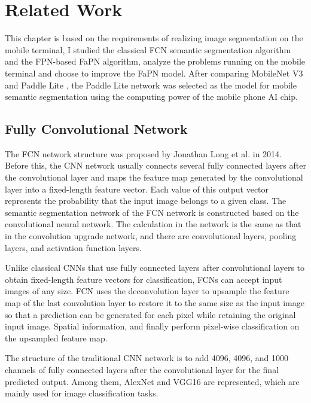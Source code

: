 \section{Related Work}
This chapter is based on the requirements of realizing image segmentation on the mobile terminal, I studied the classical FCN \cite{long2015fully} semantic segmentation algorithm and the FPN-based FaPN \cite{huang2021fapn} algorithm, analyze the problems running on the mobile terminal and choose to improve the FaPN model. After comparing MobileNet V3 and Paddle Lite \cite{paddlelite}, the Paddle Lite network was selected as the model for mobile semantic segmentation using the computing power of the mobile phone AI chip. 

\subsection{Fully Convolutional Network}
The FCN network structure \cite{long2015fully} was proposed by Jonathan Long et al. in 2014. Before this, the CNN network usually connects several fully connected layers after the convolutional layer and maps the feature map generated by the convolutional layer into a fixed-length feature vector. Each value of this output vector represents the probability that the input image belongs to a given class. The semantic segmentation network of the FCN network is constructed based on the convolutional neural network. The calculation in the network is the same as that in the convolution upgrade network, and there are convolutional layers, pooling layers, and activation function layers.

Unlike classical CNNs that use fully connected layers after convolutional layers to obtain fixed-length feature vectors for classification, FCNs can accept input images of any size. FCN uses the deconvolution layer to upsample the feature map of the last convolution layer to restore it to the same size as the input image so that a prediction can be generated for each pixel while retaining the original input image. Spatial information, and finally perform pixel-wise classification on the upsampled feature map.

The structure of the traditional CNN network is to add 4096, 4096, and 1000 channels of fully connected layers after the convolutional layer for the final predicted output. Among them, AlexNet and VGG16 are represented, which are mainly used for image classification tasks.


